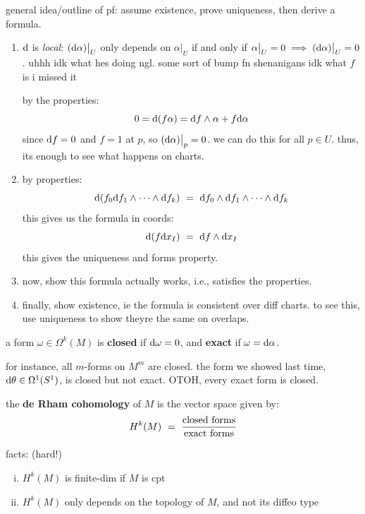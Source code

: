 general idea/outline of pf:
assume existence, prove uniqueness, then derive a formula.
\begin{enumerate}
	\item $\textrm{d}$ is \textit{local}: $(\textrm{d}\alpha)\big\rvert_{U}$ only depends on $\alpha\big\rvert_{U}$
		if and only if $\alpha\big\rvert_{U}=0 \implies (\textrm{d}\alpha)\big\rvert_{U}=0$.
		uhhh idk what hes doing ngl.
		some sort of bump fn shenanigans idk what $f$ is i missed it

		by the properties:
		\begin{equation*}
			0=\textrm{d}(f\alpha) = \textrm{d} f\wedge\alpha+f\textrm{d}\alpha
		\end{equation*}
		since $\textrm{d} f=0$ and $f=1$ at $p$, so $(\textrm{d}\alpha)\big\rvert_{p}=0$.
		we can do this for all $p \in U$.
		thus, its enough to see what happens on charts.
	\item by properties:
		\begin{equation*}
			\textrm{d}(f_{0}\textrm{d} f_{1}\wedge\cdots\wedge\textrm{d} f_{k})
			\ = \ \textrm{d} f_{0}\wedge\textrm{d} f_{1}\wedge\cdots\wedge\textrm{d} f_{k}
		\end{equation*}
		this gives us the formula in coords:
		\begin{equation*}
			\textrm{d}(f\textrm{d} x_{I}) \ = \ \textrm{d} f\wedge\textrm{d} x_{I}
		\end{equation*}
		this gives the uniqueness and forms property.
	\item now, show this formula actually works, i.e., satisfies the properties.
	\item finally, show existence, ie the formula is consistent over diff charts.
		to see this, use uniqueness to show theyre the same on overlaps.
\end{enumerate}

\begin{defn}
	a form $\omega\in\Omega^{k}(M)$ is \textbf{closed} if $\textrm{d}\omega=0$, and \textbf{exact} if $\omega=\textrm{d}\alpha$.
\end{defn}
for instance, all $m$-forms on $M^{m}$ are closed.
the form we showed last time, $\textrm{d}\theta\in\Omega^{1}(S^{1})$, is closed but not exact.
OTOH, every exact form is closed.

\begin{defn}
	the \textbf{de Rham cohomology} of $M$ is the vector space given by:
	\begin{equation*}
		H^{k}(M) \ = \ \frac{\textrm{closed forms}}{\textrm{exact forms}}
	\end{equation*}
\end{defn}
facts: (hard!)
\begin{enumerate}[i)]
	\item $H^{k}(M)$ is finite-dim if $M$ is cpt
	\item $H^{k}(M)$ only depends on the topology of $M$, and not its diffeo type
\end{enumerate}

